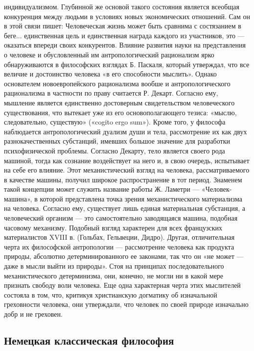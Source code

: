 \documentclass[12pt]{article}
\begin{document}
индивидуализмом. Глубинной же основой такого состояния является всеобщая конкуренция между людьми в
условиях новых экономических отношений. Сам он в этой связи пишет:
Человеческая жизнь может быть сравнима с состязанием в беге... единственная цель и единственная награда
каждого из участников, это — оказаться впереди своих конкурентов.
Влияние развития науки на представления о человеке и обусловленный им антропологический рационализм
ярко обнаруживаются в философских взглядах Б. Паскаля, который утверждал, что все величие и достоинство
человека «в его способности мыслить».
Однако основателем новоевропейского рационализма вообше и антропологического рационализма в частности 
по праву считается Р. Декарт. Согласно ему, мышление является единственно достоверным свидетельством
человеческого существования, что вытекает уже из его основополагающего тезиса: «мыслю, следовательно,
существую» («cogito ergo sum»). Кроме того, у философа наблюдается антропологический дуализм души и тела,
рассмотрение  их  как  двух  разнокачественных  субстанций,  имевших  большое  значение  для  разработки
психофизической  проблемы.  Согласно  Декарту,  тело  является  своего  рода  машиной,  тогда  как  сознание
воздействует на него и, в свою очередь, испытывает на себе его влияние.
Этот  механистический  взгляд  на  человека,  рассматриваемого  в  качестве  машины,  получил  широкое
распространение в тот период. Знаменем такой концепции может служить название работы Ж. Ламетри —
«Человек-машина»,  в  которой  представлена  точка  зрения  механистического  материализма  на  человека.
Согласно  ему,  существует  лишь  единая  материальная  субстанция,  а  человеческий  организм  —  это
самостоятельно заводящаяся машина, подобная часовому механизму.
Подобный взгляд характерен для всех французских материалистов XVIII в. (Гольбах, Гельвеции, Дидро).
Другая, отличительная черта их философской антропологии — рассмотрение человека как продукта природы,
абсолютно детерминированного ее законами, так что он «не может — даже в мысли выйти из природы». Стоя на
принципах  последовательного  механистического  детерминизма,  они,  конечно,  не  могли  ни  в  какой  мере
признать свободу воли человека. Еще одна характерная черта этих мыслителей состояла в том, что, критикуя
христианскую догматику об изначальной греховности человека, они утверждали, что человек по своей природе
изначально добр и не греховен.

\subsection{Немецкая классическая философия}
\end{document}
